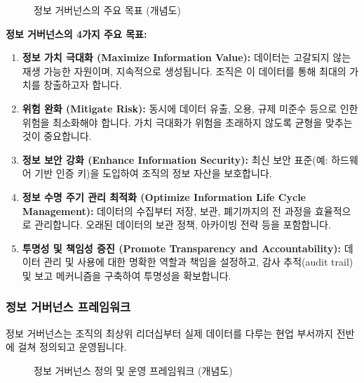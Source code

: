 \documentclass[11pt,a4paper]{article}
\theoremstyle{definition}
\begin{document}
\begin{figure}[h!]
    \centering
    \caption{정보 거버넌스의 주요 목표 (개념도)}
    \label{fig:info_gov_goals}
\end{figure}

\textbf{정보 거버넌스의 4가지 주요 목표:}
\begin{enumerate}
    \item \textbf{정보 가치 극대화 (Maximize Information Value):}
    데이터는 고갈되지 않는 재생 가능한 자원이며, 지속적으로 생성됩니다. 조직은 이 데이터를 통해 최대의 가치를 창출하고자 합니다.
    \item \textbf{위험 완화 (Mitigate Risk):}
    동시에 데이터 유출, 오용, 규제 미준수 등으로 인한 위험을 최소화해야 합니다. 가치 극대화가 위험을 초래하지 않도록 균형을 맞추는 것이 중요합니다.
    \item \textbf{정보 보안 강화 (Enhance Information Security):}
    최신 보안 표준(예: 하드웨어 기반 인증 키)을 도입하여 조직의 정보 자산을 보호합니다.
    \item \textbf{정보 수명 주기 관리 최적화 (Optimize Information Life Cycle Management):}
    데이터의 수집부터 저장, 보관, 폐기까지의 전 과정을 효율적으로 관리합니다. 오래된 데이터의 보관 정책, 아카이빙 전략 등을 포함합니다.
    \item \textbf{투명성 및 책임성 증진 (Promote Transparency and Accountability):}
    데이터 관리 및 사용에 대한 명확한 역할과 책임을 설정하고, 감사 추적(audit trail) 및 보고 메커니즘을 구축하여 투명성을 확보합니다.
\end{enumerate}

\subsubsection*{정보 거버넌스 프레임워크}
정보 거버넌스는 조직의 최상위 리더십부터 실제 데이터를 다루는 현업 부서까지 전반에 걸쳐 정의되고 운영됩니다.

\begin{figure}[h!]
    \centering
    \caption{정보 거버넌스 정의 및 운영 프레임워크 (개념도)}
    \label{fig:info_gov_framework}
\end{figure}
\end{document}
